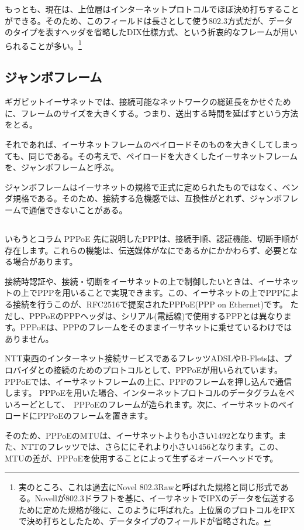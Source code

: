 もっとも、現在は、上位層はインターネットプロトコルでほぼ決め打ちすることができる。そのため、このフィールドは長さとして使う802.3方式だが、データのタイプを表すヘッダを省略したDIX仕様方式、という折衷的なフレームが用いられることが多い。\footnote{実のところ、これは過去にNovel 802.3Rawと呼ばれた規格と同じ形式である。Novellが802.3ドラフトを基に、イーサネットでIPXのデータを伝送するために定めた規格が後に、このように呼ばれた。上位層のプロトコルをIPXで決め打ちとしたため、データタイプのフィールドが省略された。}



\subsection{ジャンボフレーム}
ギガビットイーサネットでは、接続可能なネットワークの総延長をかせぐために、フレームのサイズを大きくする。つまり、送出する時間を延ばすという方法をとる。

それであれば、イーサネットフレームのペイロードそのものを大きくしてしまっても、同じである。その考えで、ペイロードを大きくしたイーサネットフレームを、ジャンボフレームと呼ぶ。

ジャンボフレームはイーサネットの規格で正式に定められたものではなく、ベンダ規格である。そのため、接続する危機感では、互換性がとれず、ジャンボフレームで通信できないことがある。


\subsection*{}
\begin{itembox}[l]{いもうとコラム PPPoE}
先に説明したPPPは、接続手順、認証機能、切断手順が存在します。これらの機能は、伝送媒体がなにであるかにかかわらず、必要となる場合があります。

接続時認証や、接続・切断をイーサネットの上で制御したいときは、イーサネットの上でPPPを用いることで実現できます。この、イーサネットの上でPPPによる接続を行うこのが、RFC2516で提案されたPPPoE(PPP on Ethernet)です。
ただし、PPPoEのPPPヘッダは、シリアル(電話線)で使用するPPPとは異なります。PPPoEは、PPPのフレームをそのままイーサネットに乗せているわけではありません。 

NTT東西のインターネット接続サービスであるフレッツADSLやB-Fletsは、プロバイダとの接続のためのプロトコルとして、PPPoEが用いられています。
PPPoEでは、イーサネットフレームの上に、PPPのフレームを押し込んで通信します。
PPPoEを用いた場合、インターネットプロトコルのデータグラムをぺいろーどとして、　PPPoEのフレームが造られます。次に、イーサネットのペイロードにPPPoEのフレームを置きます。

そのため、PPPoEのMTUは、イーサネットよりも小さい1492となります。また、NTTのフレッツでは、さらににそれより小さい1456となります。この、MTUの差が、PPPoEを使用することによって生ずるオーバーヘッドです。

\end{itembox}




